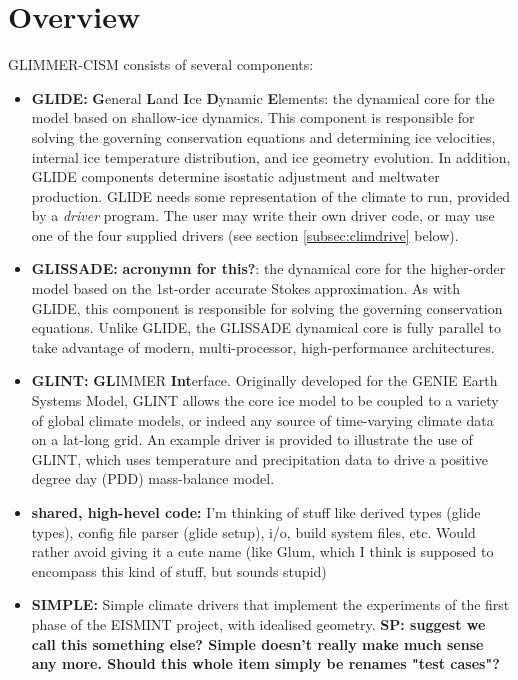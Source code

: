 \section{Overview}
%
GLIMMER-CISM consists of several components:
%
\begin{itemize}
\item {\bf GLIDE:} {\bf G}eneral {\bf L}and {\bf I}ce {\bf D}ynamic {\bf E}lements: the dynamical core for the model based on shallow-ice dynamics. This component is responsible for solving the governing conservation equations and determining ice velocities, internal ice temperature distribution, and ice geometry evolution. In addition, GLIDE components determine isostatic adjustment and meltwater production. GLIDE needs some representation of the climate to run, provided by a {\it driver} program. The user may write their own driver code, or may use one of the four supplied drivers (see section \ref{subsec:climdrive} below).
\item {\bf GLISSADE:} {\bf acronymn for this?}: the dynamical core for the higher-order model based on the 1st-order accurate Stokes approximation. As with GLIDE, this component is responsible for solving the governing conservation equations. Unlike GLIDE, the GLISSADE dynamical core is fully parallel to take advantage of modern, multi-processor, high-performance architectures.
\item {\bf GLINT:} {\bf GL}IMMER {\bf Int}erface. Originally developed for the GENIE %
Earth Systems Model, GLINT allows the core ice model to be coupled to a variety of global climate models, or indeed any source of time-varying climate data on a lat-long grid. An example driver is provided to illustrate the use of GLINT, which uses temperature and precipitation data to drive a positive degree day (PDD) mass-balance model.
\item {\bf shared, high-hevel code:} I'm thinking of stuff like derived types (glide types), config file parser (glide setup), i/o, build system files, etc. Would rather avoid giving it a cute name (like Glum, which I think is supposed to encompass this kind of stuff, but sounds stupid)
\item {\bf SIMPLE:} Simple climate drivers that implement the experiments of the first phase of the EISMINT project, with idealised geometry. \textbf{SP: suggest we call this something else? Simple doesn't really make much sense any more. Should this whole item simply be renames "test cases"?}

\end{itemize}
